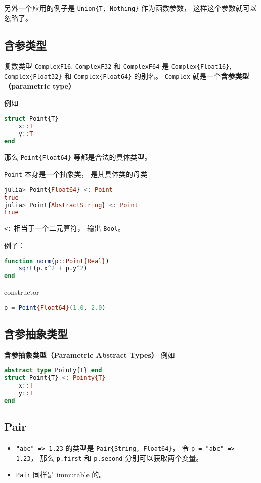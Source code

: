 另外一个应用的例子是 \verb`Union{T, Nothing}` 作为函数参数， 这样这个参数就可以忽略了。

\subsection{含参类型}

复数类型 \verb`ComplexF16`, \verb`ComplexF32` 和 \verb`ComplexF64` 是 \verb`Complex{Float16}`, \verb`Complex{Float32}` 和 \verb`Complex{Float64}` 的别名。 \verb`Complex` 就是一个\textbf{含参类型（parametric type）}

例如
\begin{lstlisting}[language=julia]
struct Point{T}
    x::T
    y::T
end
\end{lstlisting}
那么 \verb`Point{Float64}` 等都是合法的具体类型。

\verb`Point` 本身是一个抽象类， 是其具体类的母类
\begin{lstlisting}[language=julia]
julia> Point{Float64} <: Point
true
julia> Point{AbstractString} <: Point
true
\end{lstlisting}
\verb`<:` 相当于一个二元算符， 输出 \verb`Bool`。

例子：
\begin{lstlisting}[language=julia]
function norm(p::Point{Real})
    sqrt(p.x^2 + p.y^2)
end
\end{lstlisting}
constructor
\begin{lstlisting}[language=julia]
p = Point{Float64}(1.0, 2.0)
\end{lstlisting}

\subsection{含参抽象类型}
\textbf{含参抽象类型（Parametric Abstract Types）}
例如
\begin{lstlisting}[language=julia]
abstract type Pointy{T} end
struct Point{T} <: Pointy{T}
    x::T
    y::T
end
\end{lstlisting}

\subsection{Pair}
\begin{itemize}
\item \verb`"abc" => 1.23` 的类型是 \verb`Pair{String, Float64}`， 令 \verb`p = "abc" => 1.23`， 那么 \verb`p.first` 和 \verb`p.second` 分别可以获取两个变量。
\item \verb`Pair` 同样是 immutable 的。
\end{itemize}



